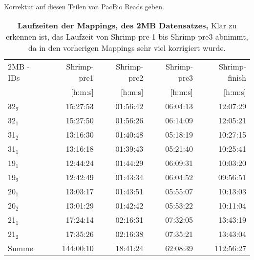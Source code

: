 \documentclass{scrartcl}
\begin{document}
Korrektur auf diesen Teilen von PacBio Reads geben. 
\begin{table}[!h]
\caption[Laufzeiten der Mappings, des 2MB Datensatzes]{\textbf{Laufzeiten der Mappings, des 2MB Datensatzes,} Klar zu erkennen ist, das Laufzeit von Shrimp-pre-1 bis Shrimp-pre3 abnimmt, da in den vorherigen Mappings sehr viel korrigiert wurde.}
\begin{center}
\begin{tabular}{lrrrr}
2MB - IDs & Shrimp-pre1 & Shrimp-pre2 & Shrimp-pre3 & Shrimp-finish\\
 & [h:m:s] & [h:m:s] & [h:m:s] & [h:m:s]\\
\hline
32$_{\text{2}}$ & 15:27:53 & 01:56:42 & 06:04:13 & 12:07:29\\
32$_{\text{1}}$ & 15:27:50 & 01:56:26 & 06:14:09 & 12:05:21\\
31$_{\text{2}}$ & 13:16:30 & 01:40:48 & 05:18:19 & 10:27:15\\
31$_{\text{1}}$ & 13:16:18 & 01:39:43 & 05:21:40 & 10:25:41\\
19$_{\text{1}}$ & 12:44:24 & 01:44:29 & 06:09:31 & 10:03:20\\
19$_{\text{2}}$ & 12:42:49 & 01:43:34 & 06:04:52 & 09:56:51\\
20$_{\text{1}}$ & 13:03:17 & 01:43:51 & 05:55:07 & 10:13:03\\
20$_{\text{2}}$ & 13:01:29 & 01:42:42 & 05:53:22 & 10:11:04\\
21$_{\text{1}}$ & 17:24:14 & 02:16:31 & 07:32:05 & 13:43:19\\
21$_{\text{2}}$ & 17:35:26 & 02:16:38 & 07:35:21 & 13:43:04\\
Summe & 144:00:10 & 18:41:24 & 62:08:39 & 112:56:27\\
\end{tabular}
\end{center}
\end{table}
\end{document}
